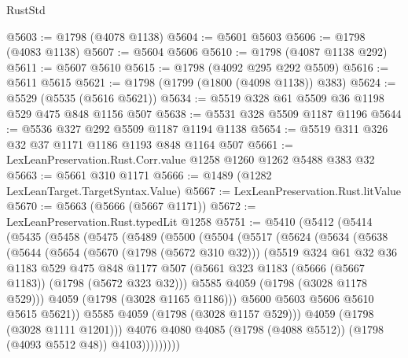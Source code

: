 \begin{lexlean}{RustStd}
\begin{coremodule}
{\begin{coremodule}
{{{{{{{{{{{{@5603 := @1798 (@4078 @1138)
@5604 := @5601 @5603
@5606 := @1798 (@4083 @1138)
@5607 := @5604 @5606
@5610 := @1798 (@4087 @1138 @292)
@5611 := @5607 @5610
@5615 := @1798 (@4092 @295 @292 @5509)
@5616 := @5611 @5615
@5621 := @1798 (@1799 (@1800 (@4098 @1138)) @383)
@5624 := @5529 (@5535 (@5616 @5621))
@5634 := @5519 @328 @61 @5509 @36 @1198 @529 @475 @848 @1156 @507
@5638 := @5531 @328 @5509 @1187 @1196
@5644 := @5536 @327 @292 @5509 @1187 @1194 @1138
@5654 := @5519 @311 @326 @32 @37 @1171 @1186 @1193 @848 @1164 @507
@5661 := LexLeanPreservation.Rust.Corr.value @1258 @1260 @1262 @5488 @383 @32
@5663 := @5661 @310 @1171
@5666 := @1489 (@1282 LexLeanTarget.TargetSyntax.Value)
@5667 := LexLeanPreservation.Rust.litValue
@5670 := @5663 (@5666 (@5667 @1171))
@5672 := LexLeanPreservation.Rust.typedLit @1258
@5751 := @5410
    (@5412
      (@5414
        (@5435
          (@5458
            (@5475
              (@5489
                (@5500
                  (@5504
                    (@5517
                      (@5624
                        (@5634
                          (@5638
                            (@5644
                              (@5654
                                (@5670 (@1798 (@5672 @310 @32)))
                                (@5519
                                  @324
                                  @61
                                  @32
                                  @36
                                  @1183
                                  @529
                                  @475
                                  @848
                                  @1177
                                  @507
                                  (@5661 @323 @1183 (@5666 (@5667 @1183)) (@1798 (@5672 @323 @32)))
                                  @5585
                                  @4059
                                  (@1798 (@3028 @1178 @529)))
                                @4059
                                (@1798 (@3028 @1165 @1186)))
                              @5600
                              @5603
                              @5606
                              @5610
                              @5615
                              @5621))
                          @5585
                          @4059
                          (@1798 (@3028 @1157 @529)))
                        @4059
                        (@1798 (@3028 @1111 @1201)))
                      @4076
                      @4080
                      @4085
                      (@1798 (@4088 @5512))
                      (@1798 (@4093 @5512 @48))
                      @4103)))))))))
}}}}}}}}}}}}
\end{coremodule}}
\end{coremodule}
\end{lexlean}
